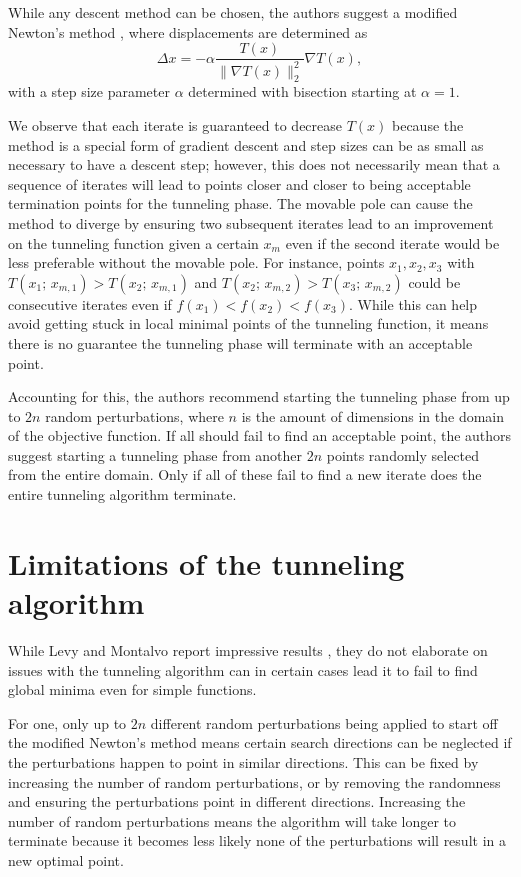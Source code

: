 \documentclass[a4paper,12pt,twoside]{article}
\begin{document}
While any descent method can be chosen, the authors suggest a modified Newton's method \cite[28]{levy_tunneling_1985}, where displacements are determined as \cite[\S 2.3.4]{levy_tunneling_1985}
\begin{equation}\label{eq:Delta_x}
\Delta x = - \alpha \frac{T(x)}{\|\nabla T(x) \|_2^2} \nabla T(x),
\end{equation}
with a step size parameter $\alpha$ determined with bisection starting at $\alpha = 1$. 

We observe that each iterate is guaranteed to decrease $T(x)$ because the method is a special form of gradient descent and step sizes can be as small as necessary to have a descent step; however, this does not necessarily mean that a sequence of iterates will lead to points closer and closer to being acceptable termination points for the tunneling phase. The movable pole can cause the method to diverge by ensuring two subsequent iterates lead to an improvement on the tunneling function given a certain $x_m$ even if the second iterate would be less preferable without the movable pole. For instance, points $x_1, x_2, x_3$ with $T(x_1; \, x_{m,1}) > T(x_2; \, x_{m, 1})$ and $T(x_2; \, x_{m,2}) > T(x_3; \, x_{m, 2})$ could be consecutive iterates even if $f(x_1) < f(x_2) < f(x_3)$. While this can help avoid getting stuck in local minimal points of the tunneling function, it means there is no guarantee the tunneling phase will terminate with an acceptable point.

Accounting for this, the authors recommend starting the tunneling phase from up to $2n$ random perturbations, where $n$ is the amount of dimensions in the domain of the objective function. If all should fail to find an acceptable point, the authors suggest starting a tunneling phase from another $2n$ points randomly selected from the entire domain. Only if all of these fail to find a new iterate does the entire tunneling algorithm terminate.




\section{Limitations of the tunneling algorithm}

While Levy and Montalvo report impressive results \cite[\S 5]{levy_tunneling_1985}, they do not elaborate on issues with the tunneling algorithm can in certain cases lead it to fail to find global minima even for simple functions. 

For one, only up to $2n$ different random perturbations being applied to start off the modified Newton's method means certain search directions can be neglected if the perturbations happen to point in similar directions. This can be fixed by increasing the number of random perturbations, or by removing the randomness and ensuring the perturbations point in different directions. Increasing the number of random perturbations means the algorithm will take longer to terminate because it becomes less likely none of the perturbations will result in a new optimal point. 
\end{document}
